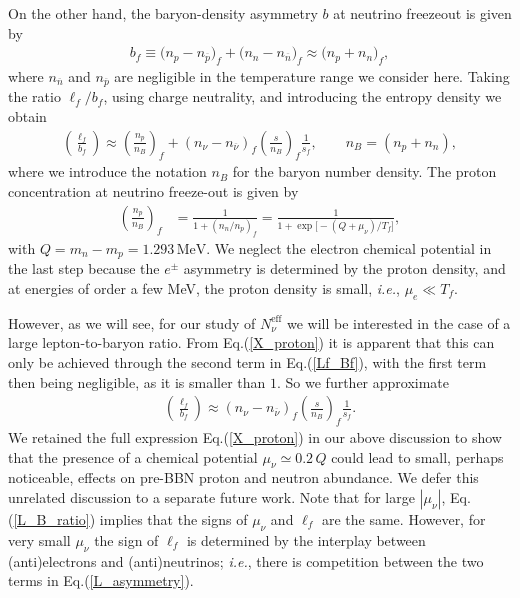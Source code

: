 On the other hand, the baryon-density asymmetry $b$ at neutrino freezeout is given by
\begin{align}
\label{B_asymmetry}
b_f \equiv\big(n_p-n_{\overline{p}}\big)_f+\big(n_n-n_{\overline{n}}\big)_f \approx \big(n_p+n_n\big)_f,
\end{align}
where $n_{\overline{n}}$ and $n_{\overline{p}}$ are negligible in the temperature range we consider here. Taking the ratio $\ell_f/b_f$, using charge neutrality, and introducing the entropy density we obtain
\begin{align}\label{Lf_Bf}
\left(\frac{\ell_f}{b_f}\right)  
\approx\left(\frac{n_p}{n_B} \right)_f+\left(n_{\nu}-n_{\overline{\nu}}\right)_f \left(\frac{s}{n_B}\right)_f \frac{1}{s_f},\qquad n_B=(n_p+n_n),
\end{align}
where we introduce the notation $n_B$ for the baryon number density. The proton concentration at neutrino freeze-out is given by
\begin{align}
\label{X_proton}
\left(\frac{n_p}{n_B}\right)_f&=\frac{1}{1+(n_n/n_p)_f}=\frac{1}{1+\exp{\big[-\left(Q+\mu_\nu\right)/T_f\big]}},
\end{align}
with $Q=m_n-m_p=1.293\,\mathrm{MeV}$. We neglect the electron chemical potential in the last step because the $e^\pm$ asymmetry is determined by the proton density, and at energies of order a few MeV, the proton density is small, {\it i.e.\/}, $\mu_e\ll T_f$. 

However, as we will see, for our study of $N_\nu^{\mathrm{eff}}$ we will be interested in the case of a large lepton-to-baryon ratio. From Eq.\;(\ref{X_proton}) it is apparent that this can only be achieved through the second term in Eq.\;(\ref{Lf_Bf}), with the first term then being negligible, as it is smaller than $1$. So we further approximate
\begin{align}\label{L_B_ratio}
\left(\frac{\ell_f}{b_f}\right)  
\approx\left(n_{\nu}-n_{\overline{\nu}}\right)_f \left(\frac{s}{n_B}\right)_f \frac{1}{s_f}.
\end{align}
We retained the full expression Eq.\;(\ref{X_proton}) in our above discussion to show that the presence of a chemical potential $\mu_\nu\simeq 0.2\,Q$ could lead to small, perhaps noticeable, effects on pre-BBN proton and neutron abundance. We defer this unrelated discussion to a separate future work. Note that for large $|\mu_\nu|$, Eq.\;(\ref{L_B_ratio}) implies that the signs of $\mu_\nu$ and $\ell_f$ are the same. However, for very small $\mu_\nu$ the sign of $\ell_f$ is determined by the interplay between (anti)electrons and (anti)neutrinos; {\it i.e.\/}, there is competition between the two terms in Eq.\;(\ref{L_asymmetry}).

